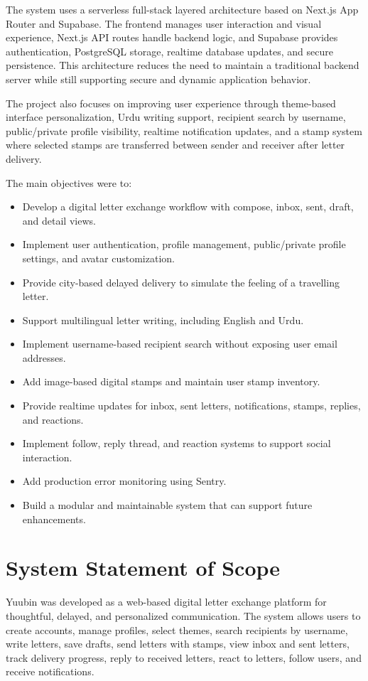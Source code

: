 ﻿\documentclass[12pt,a4paper]{report}
\begin{document}
The system uses a serverless full-stack layered architecture based on Next.js App Router and Supabase. The frontend manages user interaction and visual experience, Next.js API routes handle backend logic, and Supabase provides authentication, PostgreSQL storage, realtime database updates, and secure persistence. This architecture reduces the need to maintain a traditional backend server while still supporting secure and dynamic application behavior.

The project also focuses on improving user experience through theme-based interface personalization, Urdu writing support, recipient search by username, public/private profile visibility, realtime notification updates, and a stamp system where selected stamps are transferred between sender and receiver after letter delivery.

\noindent The main objectives were to:
\begin{itemize}
    \item Develop a digital letter exchange workflow with compose, inbox, sent, draft, and detail views.
    \item Implement user authentication, profile management, public/private profile settings, and avatar customization.
    \item Provide city-based delayed delivery to simulate the feeling of a travelling letter.
    \item Support multilingual letter writing, including English and Urdu.
    \item Implement username-based recipient search without exposing user email addresses.
    \item Add image-based digital stamps and maintain user stamp inventory.
    \item Provide realtime updates for inbox, sent letters, notifications, stamps, replies, and reactions.
    \item Implement follow, reply thread, and reaction systems to support social interaction.
    \item Add production error monitoring using Sentry.
    \item Build a modular and maintainable system that can support future enhancements.
\end{itemize}

\section{System Statement of Scope}

Yuubin was developed as a web-based digital letter exchange platform for thoughtful, delayed, and personalized communication. The system allows users to create accounts, manage profiles, select themes, search recipients by username, write letters, save drafts, send letters with stamps, view inbox and sent letters, track delivery progress, reply to received letters, react to letters, follow users, and receive notifications.
\end{document}
